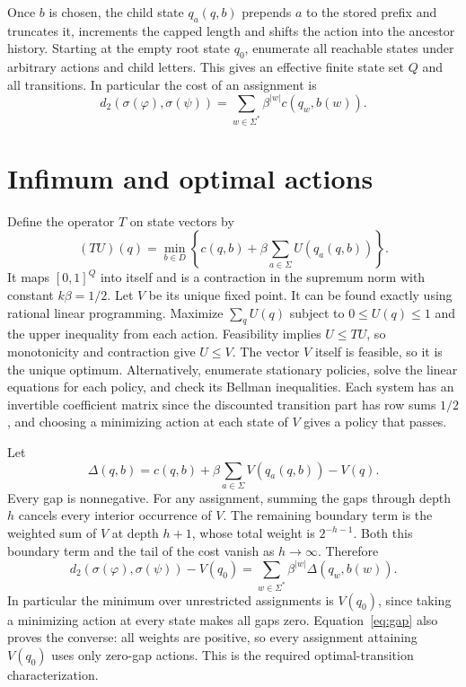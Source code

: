 \documentclass[11pt,a4paper]{amsart}
\begin{document}
Once \(b\) is chosen, the child state \(q_a(q,b)\) prepends \(a\) to the stored prefix and truncates it, increments the capped length and shifts the action into the ancestor history. Starting at the empty root state \(q_0\), enumerate all reachable states under arbitrary actions and child letters. This gives an effective finite state set \(Q\) and all transitions. In particular the cost of an assignment is
\[
 d_2(\sigma(\varphi),\sigma(\psi))
   =\sum_{w\in\Sigma^*}\beta^{|w|}c(q_w,b(w)).
\]

\section{Infimum and optimal actions}
Define the operator \(T\) on state vectors by
\[
 (TU)(q)=\min_{b\in D}\left\{c(q,b)+\beta\sum_{a\in\Sigma} U(q_a(q,b))\right\}.
\]
It maps \([0,1]^Q\) into itself and is a contraction in the supremum norm with constant \(k\beta=1/2\). Let \(V\) be its unique fixed point. It can be found exactly using rational linear programming. Maximize \(\sum_q U(q)\) subject to \(0\le U(q)\le1\) and the upper inequality from each action. Feasibility implies \(U\le TU\), so monotonicity and contraction give \(U\le V\). The vector \(V\) itself is feasible, so it is the unique optimum. Alternatively, enumerate stationary policies, solve the linear equations for each policy, and check its Bellman inequalities. Each system has an invertible coefficient matrix since the discounted transition part has row sums \(1/2\), and choosing a minimizing action at each state of \(V\) gives a policy that passes.

Let
\[
 \Delta(q,b)=c(q,b)+\beta\sum_{a\in\Sigma}V(q_a(q,b))-V(q).
\]
Every gap is nonnegative. For any assignment, summing the gaps through depth \(h\) cancels every interior occurrence of \(V\). The remaining boundary term is the weighted sum of \(V\) at depth \(h+1\), whose total weight is \(2^{-h-1}\). Both this boundary term and the tail of the cost vanish as \(h\to\infty\). Therefore
\begin{equation}\label{eq:gap}
 d_2(\sigma(\varphi),\sigma(\psi))-V(q_0)
   =\sum_{w\in\Sigma^*}\beta^{|w|}\Delta(q_w,b(w)).
\end{equation}
In particular the minimum over unrestricted assignments is \(V(q_0)\), since taking a minimizing action at every state makes all gaps zero. Equation~\eqref{eq:gap} also proves the converse: all weights are positive, so every assignment attaining \(V(q_0)\) uses only zero-gap actions. This is the required optimal-transition characterization.
\end{document}
